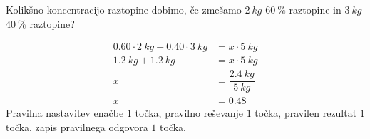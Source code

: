 \documentclass[addpoints]{exam}
\begin{document}
\begin{questions}



        \question[4]
        Kolikšno koncentracijo raztopine dobimo, če zmešamo $2~kg$ $60~\%$ raztopine in $3~kg$ $40~\%$ raztopine?

        \begin{solution}[3cm]
            \begin{align*}
                0.60 \cdot 2~kg + 0.40\cdot 3~kg &= x \cdot 5~kg \\
                                 1.2~kg+1.2~kg &= x\cdot 5~kg \\
                                            x &= \dfrac{2.4~kg}{5~kg} \\
                                            x &= 0.48
            \end{align*}
            Pravilna nastavitev enačbe $1$ točka, pravilno reševanje $1$ točka, pravilen rezultat $1$ točka, zapis pravilnega odgovora $1$ točka.
        \end{solution}




\end{questions}
\end{document}
